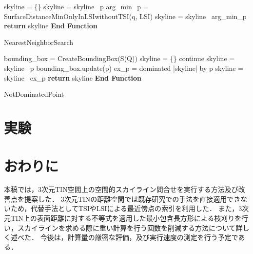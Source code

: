 \documentclass{fit}
\theoremstyle{definition}
\begin{document}
\begin{algorithm}[t]
  \SetAlgoLined
  \DontPrintSemicolon
  {
    skyline = \{\}\;
    {
      {
        skyline = skyline \cup ~p\;
      }
      {
        arg\_min\_p = SurfaceDistanceMinOnlyInLSIwithoutTSI(q, LSI)\;
        skyline = skyline \cup ~arg\_min\_p\;
      }
    }
    \textbf{return} skyline
  }
  \textbf{End Function}
  \caption{NearestNeighborSearch}
  \label{impl:NearestNeighborSearch}
\end{algorithm}


\begin{algorithm}[t]
  \SetAlgoLined
  \DontPrintSemicolon
  {
    bounding\_box = CreateBoundingBox(S(Q))\;
    skyline = \{\}\;
    {
      {
        continue\;
      }
      {
        skyline = skyline \cup ~p\;
        bounding\_box.update(p)\;
        {
          ex\_p = dominated |skyline| by p\;
          skyline = skyline \setminus ~ex\_p\;
        }
      }
    }
    \textbf{return} skyline
  }
  \textbf{End Function}
  \caption{NotDominatedPoint}
  \label{impl:NotDominatedPoint}
\end{algorithm}

\section{実験}

\section{おわりに}

本稿では，3次元TIN空間上の空間的スカイライン問合せを実行する方法及び改善点を提案した．
3次元TINの距離空間では既存研究での手法を直接適用できないため，代替手法としてTSIやLSIによる最近傍点の索引を利用した．
また，3次元TIN上の表面距離に対する不等式を適用した最小包含長方形による枝刈りを行い，スカイラインを求める際に重い計算を行う回数を削減する方法について詳しく述べた．
今後は，計算量の厳密な評価，及び実行速度の測定を行う予定である．
\end{document}

